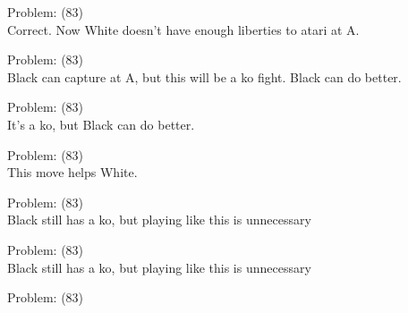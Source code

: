 \documentclass[11pt]{article}
\begin{document}
\begin{minipage}[t]{0.5\textwidth}
  {\centering
  
  Problem: (83)\\
  Correct. Now White doesn't have enough liberties to atari at A.\\
  }
\end{minipage}
\begin{minipage}[t]{0.5\textwidth}
  {\centering
  
  Problem: (83)\\
  Black can capture at A, but this will be a ko fight. Black can do better.\\
  }
\end{minipage}
\begin{minipage}[t]{0.5\textwidth}
  {\centering
  
  Problem: (83)\\
  It's a ko, but Black can do better.\\
  }
\end{minipage}
\begin{minipage}[t]{0.5\textwidth}
  {\centering
  
  Problem: (83)\\
  This move helps White.\\
  }
\end{minipage}
\begin{minipage}[t]{0.5\textwidth}
  {\centering
  
  Problem: (83)\\
  Black still has a ko, but playing like this is unnecessary\\
  }
\end{minipage}
\begin{minipage}[t]{0.5\textwidth}
  {\centering
  
  Problem: (83)\\
  Black still has a ko, but playing like this is unnecessary\\
  }
\end{minipage}
\begin{minipage}[t]{0.5\textwidth}
  {\centering
  
  Problem: (83)\\
  
  }
\end{minipage}
\end{document}
